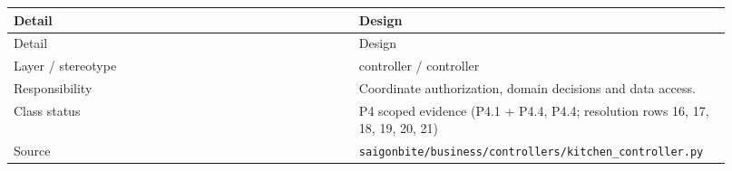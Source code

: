 \begin{longtable}{>{\raggedright\arraybackslash}p{0.4600\linewidth}>{\raggedright\arraybackslash}p{0.4600\linewidth}}
Detail & Design \\
\hline\endfirsthead
Detail & Design \\
\hline\endhead
Layer / stereotype & controller / \guillemotleft{}controller\guillemotright{} \\
Responsibility & Coordinate authorization, domain decisions and data access. \\
Class status & P4 scoped evidence (P4.1 + P4.4, P4.4; resolution rows 16, 17, 18, 19, 20, 21) \\
Source & \texttt{saigonbite/\allowbreak{}business/\allowbreak{}controllers/\allowbreak{}kitchen\_\allowbreak{}controller.\allowbreak{}py} \\
\end{longtable}
